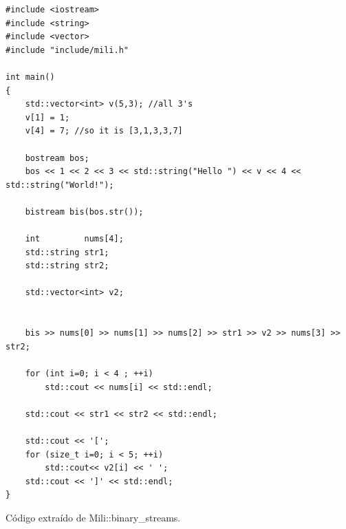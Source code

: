 		\begin{table}[!htb]
        	\lstset{language=C++}
        	\begin{lstlisting}[frame=single]
#include <iostream>
#include <string>
#include <vector>
#include "include/mili.h"

int main()
{
    std::vector<int> v(5,3); //all 3's
    v[1] = 1;
    v[4] = 7; //so it is [3,1,3,3,7]

    bostream bos;
    bos << 1 << 2 << 3 << std::string("Hello ") << v << 4 << std::string("World!");

    bistream bis(bos.str());

    int         nums[4];
    std::string str1;
    std::string str2;

    std::vector<int> v2;


    bis >> nums[0] >> nums[1] >> nums[2] >> str1 >> v2 >> nums[3] >> str2;

    for (int i=0; i < 4 ; ++i)
        std::cout << nums[i] << std::endl;

    std::cout << str1 << str2 << std::endl;

    std::cout << '[';
    for (size_t i=0; i < 5; ++i)
        std::cout<< v2[i] << ' ';
    std::cout << ']' << std::endl;
}
        	\end{lstlisting}
        	\centering \caption{C\'odigo extra\'ido de Mili::binary\_streams.} 
        	\label{bstreamusage}
        \end{table}
        

